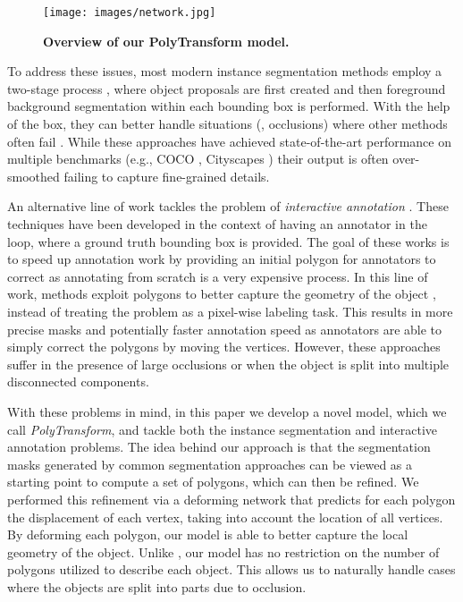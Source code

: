 \documentclass[10pt,twocolumn,letterpaper]{article}
\begin{document}
\begin{figure*}[htb!]
\vspace{-5mm}
\texttt{[image: images/network.jpg]}
\caption{\textbf{Overview of our PolyTransform model.}}
\vspace{-5mm}
\label{fig:network}
\end{figure*}




To address these issues, most modern instance segmentation methods employ a two-stage process \cite{mask-rcnn,upsnet,panet}, where  object proposals  are first created and  then   foreground background segmentation within each bounding box is performed. With the help of the box, they can better handle situations (\eg, occlusions) where other methods often fail \cite{bai2017deep}. 
While these approaches have achieved state-of-the-art performance on multiple benchmarks (e.g., COCO \cite{coco}, Cityscapes 
\cite{cityscapes}) their output is often over-smoothed failing to capture  fine-grained details. 


An alternative line of work tackles the problem of {\it interactive annotation} \cite{polygon-rnn,polygon-rnn++, wang2019delse, ling2019fast}. These techniques have been developed in the context of having an annotator in the loop, where a ground truth bounding box is provided. The goal of these works is to speed up annotation work by providing an initial polygon for annotators to correct as annotating from scratch is a very expensive process. In this line of work, methods exploit polygons to better capture the geometry of the object \cite{polygon-rnn,polygon-rnn++, ling2019fast}, instead of treating the problem as  a pixel-wise labeling task. This results in more precise masks and potentially faster annotation speed as annotators are able to simply correct the polygons by moving the vertices. 
However, these approaches suffer in the presence of  large occlusions or when the object is split into multiple disconnected components.  


With these problems in mind, in this paper we develop a novel model, which we call {\it PolyTransform}, and tackle both the {instance segmentation} and {interactive annotation} problems. The idea behind our approach is that the segmentation masks generated by common segmentation approaches can be viewed as a starting point to compute a set of  polygons, which can then  be refined. We performed this refinement via 
a deforming network that  predicts for each polygon the displacement of each vertex, taking into account the location of all vertices. By deforming each polygon, our model is able to better capture the local geometry of the object.   Unlike \cite{polygon-rnn,polygon-rnn++, ling2019fast},  our model has no restriction on the number of polygons utilized to describe each object. 
This allows us to naturally handle cases where the objects are split into parts due to occlusion. 
\end{document}
